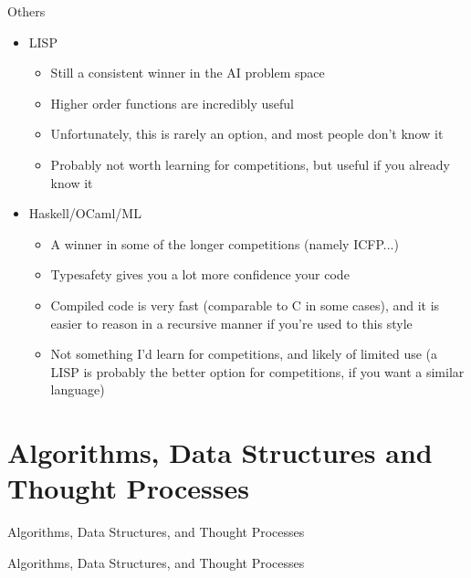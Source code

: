 \documentclass{beamer}
\begin{document}
\begin{frame}{Others}
  \begin{centering}
    \begin{itemize}
      \item LISP
      \begin{itemize}
        \item Still a consistent winner in the AI problem space
        \item Higher order functions are incredibly useful
        \item Unfortunately, this is rarely an option, and most people don't know it
        \item Probably not worth learning for competitions, but useful if you already know it
      \end{itemize}
      \item Haskell/OCaml/ML
      \begin{itemize}
        \item A winner in some of the longer competitions (namely ICFP...)
        \item Typesafety gives you a lot more confidence your code
        \item Compiled code is very fast (comparable to C in some cases), and it is easier to reason in a recursive manner if you're used to this style
        \item Not something I'd learn for competitions, and likely of limited use (a LISP is probably the better option for competitions, if you want a similar language)
      \end{itemize}
    \end{itemize}
  \end{centering}
\end{frame}


\section{Algorithms, Data Structures and Thought Processes}

\begin{frame}{Algorithms, Data Structures, and Thought Processes}
  \begin{centering}
    \huge{Algorithms, Data Structures, and Thought Processes}
  \end{centering}
\end{frame}
\end{document}
